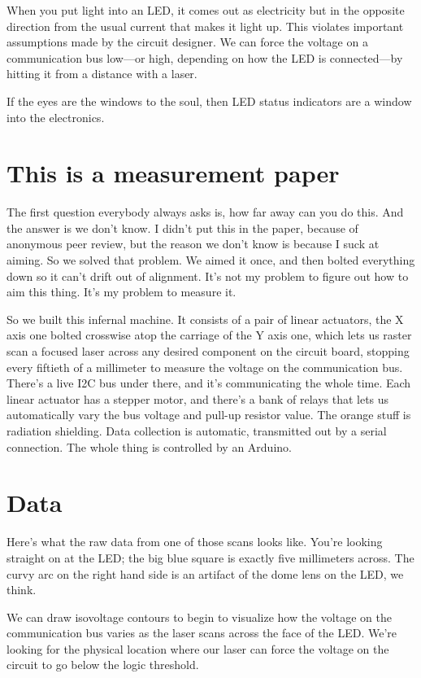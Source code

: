 \documentclass[letterpaper]{article}
\begin{document}
When you put light into an LED, it comes out as electricity but in the opposite
direction from the usual current that makes it light up. This violates
important assumptions made by the circuit designer. We can force the voltage on
a communication bus low---or high, depending on how the LED is connected---by
hitting it from a distance with a laser.

If the eyes are the windows to the soul, then LED status indicators are a
window into the electronics.
\section{This is a measurement paper}
The first question everybody always asks is, how far away can you do this. And
the answer is we don't know. I didn't put this in the paper, because of
anonymous peer review, but the reason we don't know is because I suck at
aiming. So we solved that problem. We aimed it once, and then bolted everything
down so it can't drift out of alignment. It's not my problem to figure out how
to aim this thing. It's my problem to measure it.

So we built this infernal machine. It consists of a pair of linear actuators,
the X axis one bolted crosswise atop the carriage of the Y axis one, which lets
us raster scan a focused laser across any desired component on the circuit
board, stopping every fiftieth of a millimeter to measure the voltage on the
communication bus. There's a live I2C bus under there, and it's communicating
the whole time. Each linear actuator has a stepper motor, and there's a bank of
relays that lets us automatically vary the bus voltage and pull-up resistor
value. The orange stuff is radiation shielding. Data collection is automatic,
transmitted out by a serial connection. The whole thing is controlled by an
Arduino.
\section{Data}
Here's what the raw data from one of those scans looks like. You're looking
straight on at the LED; the big blue square is exactly five millimeters across.
The curvy arc on the right hand side is an artifact of the dome lens on the
LED, we think.

We can draw isovoltage contours to begin to visualize how the voltage on the
communication bus varies as the laser scans across the face of the LED. We're
looking for the physical location where our laser can force the voltage on the
circuit to go below the logic threshold.
\end{document}
